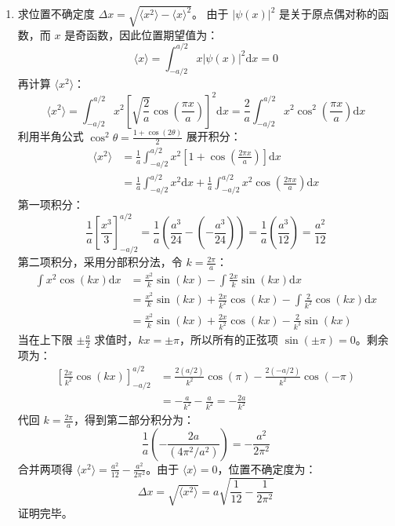 \begin{solution}
\begin{enumerate}
    \item[(c)] 求位置不确定度 $\Delta x = \sqrt{\langle x^2 \rangle - \langle x \rangle^2}$。
    由于 $|\psi(x)|^2$ 是关于原点偶对称的函数，而 $x$ 是奇函数，因此位置期望值为：
    $$ \langle x \rangle = \int_{-a/2}^{a/2} x |\psi(x)|^2 \mathrm{d}x = 0 $$
    再计算 $\langle x^2 \rangle$：
    $$ \langle x^2 \rangle = \int_{-a/2}^{a/2} x^2 \left[ \sqrt{\frac{2}{a}} \cos\left(\frac{\pi x}{a}\right) \right]^2 \mathrm{d}x = \frac{2}{a} \int_{-a/2}^{a/2} x^2 \cos^2\left(\frac{\pi x}{a}\right) \mathrm{d}x $$
    利用半角公式 $\cos^2\theta = \frac{1 + \cos(2\theta)}{2}$ 展开积分：
    \[
    \begin{aligned}
    \langle x^2 \rangle &= \frac{1}{a} \int_{-a/2}^{a/2} x^2 \left[ 1 + \cos\left(\frac{2\pi x}{a}\right) \right] \mathrm{d}x\\
      &= \frac{1}{a} \int_{-a/2}^{a/2} x^2 \mathrm{d}x + \frac{1}{a} \int_{-a/2}^{a/2} x^2 \cos\left(\frac{2\pi x}{a}\right) \mathrm{d}x
    \end{aligned}
    \]
    第一项积分：
    $$ \frac{1}{a} \left[ \frac{x^3}{3} \right]_{-a/2}^{a/2} = \frac{1}{a} \left( \frac{a^3}{24} - \left(-\frac{a^3}{24}\right) \right) = \frac{1}{a} \left( \frac{a^3}{12} \right) = \frac{a^2}{12} $$
    第二项积分，采用分部积分法，令 $k = \frac{2\pi}{a}$：
    \begin{align*}
        \int x^2 \cos(kx) \mathrm{d}x &= \frac{x^2}{k} \sin(kx) - \int \frac{2x}{k} \sin(kx) \mathrm{d}x \\
                             &= \frac{x^2}{k} \sin(kx) + \frac{2x}{k^2} \cos(kx) - \int \frac{2}{k^2} \cos(kx) \mathrm{d}x \\
                             &= \frac{x^2}{k} \sin(kx) + \frac{2x}{k^2} \cos(kx) - \frac{2}{k^3} \sin(kx)
    \end{align*}
    当在上下限 $\pm \frac{a}{2}$ 求值时，$kx = \pm \pi$，所以所有的正弦项 $\sin(\pm\pi) = 0$。剩余项为：
    \begin{align*}
        \left[ \frac{2x}{k^2} \cos(kx) \right]_{-a/2}^{a/2} &= \frac{2(a/2)}{k^2} \cos(\pi) - \frac{2(-a/2)}{k^2} \cos(-\pi) \\
        &= - \frac{a}{k^2} - \frac{a}{k^2} = - \frac{2a}{k^2}
    \end{align*}
    代回 $k = \frac{2\pi}{a}$，得到第二部分积分为：
    $$ \frac{1}{a} \left( - \frac{2a}{(4\pi^2/a^2)} \right) = - \frac{a^2}{2\pi^2} $$
    合并两项得 $\langle x^2 \rangle = \frac{a^2}{12} - \frac{a^2}{2\pi^2}$。由于 $\langle x \rangle = 0$，位置不确定度为：
    $$ \Delta x = \sqrt{\langle x^2 \rangle} = a \sqrt{\frac{1}{12} - \frac{1}{2\pi^2}} $$
    证明完毕。
\end{enumerate}
\end{solution}

